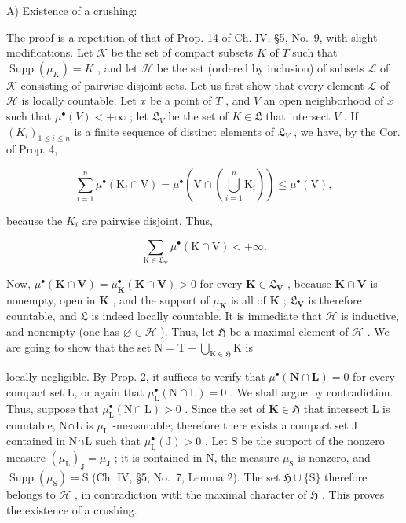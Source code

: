 A) Existence of a crushing:

The proof is a repetition of that of Prop. 14 of Ch. IV, §5, No.~9, with slight modifications. Let \(\mathcal{K}\) be the set of compact subsets \(K\) of \(T\) such that \(\operatorname{Supp}(\mu_K) = K\) , and let \(\mathcal{H}\) be the set (ordered by inclusion) of subsets \(\mathcal{L}\) of \(\mathcal{K}\) consisting of pairwise disjoint sets. Let us first show that every element \(\mathcal{L}\) of \(\mathcal{H}\) is locally countable. Let \(x\) be a point of \(T\) , and \(V\) an open neighborhood of \(x\) such that \(\mu^\bullet(V) < +\infty\) ; let \(\mathfrak{L}_V\) be the set of \(K \in \mathfrak{L}\) that intersect \(V\) . If \((K_i)_{1 \leqslant i \leqslant n}\) is a finite sequence of distinct elements of \(\mathfrak{L}_V\) , we have, by the Cor. of Prop. 4,

\[
\sum_ {i = 1} ^ {n} \mu^ {\bullet} (\mathrm{K} _ {i} \cap \mathrm{V}) = \mu^ {\bullet} \left(\mathrm{V} \cap \left(\bigcup_ {i = 1} ^ {n} \mathrm{K} _ {i}\right)\right) \leqslant \mu^ {\bullet} (\mathrm{V}),
\]

because the \(K_{i}\) are pairwise disjoint. Thus,

\[
\sum_ {\mathrm{K} \in \mathfrak {L} _ {\mathrm{V}}} \mu^ {\bullet} (\mathrm{K} \cap \mathrm{V}) <   + \infty .
\]

Now, \(\mu^{\bullet}(\mathbf{K}\cap \mathbf{V}) = \mu_{\mathbf{K}}^{\bullet}(\mathbf{K}\cap \mathbf{V}) > 0\) for every \(\mathbf{K}\in \mathfrak{L}_{\mathbf{V}}\) , because \(\mathbf{K}\cap \mathbf{V}\) is nonempty, open in \(\mathbf{K}\) , and the support of \(\mu_{\mathbf{K}}\) is all of \(\mathbf{K}\) ; \(\mathfrak{L}_{\mathbf{V}}\) is therefore countable, and \(\mathfrak{L}\) is indeed locally countable. It is immediate that \(\mathcal{H}\) is inductive, and nonempty (one has \(\varnothing \in \mathcal{H}\) ). Thus, let \(\mathfrak{H}\) be a maximal element of \(\mathcal{H}\) . We are going to show that the set \(\mathrm{N} = \mathrm{T} - \bigcup_{\mathrm{K}\in \mathfrak{H}}\mathrm{K}\) is

locally negligible. By Prop. 2, it suffices to verify that \(\mu^{\bullet}(\mathbf{N}\cap\mathbf{L})=0\) for every compact set L, or again that \(\mu_{\mathrm{L}}^{\bullet}(\mathrm{N}\cap\mathrm{L})=0\) . We shall argue by contradiction. Thus, suppose that \(\mu_{\mathrm{L}}^{\bullet}(\mathrm{N}\cap\mathrm{L})>0\) . Since the set of \(\mathbf{K}\in\mathfrak{H}\) that intersect L is countable, N∩L is \(\mu_{\mathrm{L}}\) -measurable; therefore there exists a compact set J contained in N∩L such that \(\mu_{\mathrm{L}}^{\bullet}(\mathrm{J})>0\) . Let S be the support of the nonzero measure \((\mu_{\mathrm{L}})_{\mathrm{J}}=\mu_{\mathrm{J}}\) ; it is contained in N, the measure \(\mu_{\mathrm{S}}\) is nonzero, and \(\operatorname{Supp}(\mu_{\mathrm{S}})=\mathrm{S}\) (Ch. IV, §5, No.~7, Lemma 2). The set \(\mathfrak{H}\cup\{\mathrm{S}\}\) therefore belongs to \(\mathscr{H}\) , in contradiction with the maximal character of \(\mathfrak{H}\) . This proves the existence of a crushing.

